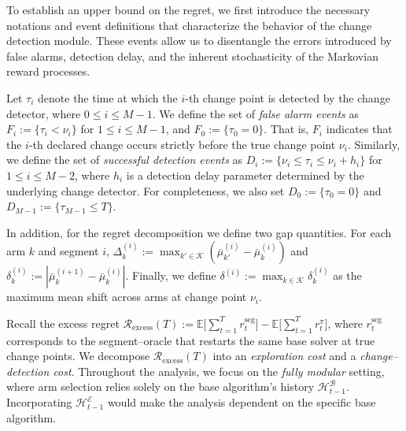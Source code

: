 \documentclass[twoside]{article}
\theoremstyle{plain}
\theoremstyle{definition}
\theoremstyle{remark}
\def\Rex{\mathcal{R}_{\mathrm{excess}}}
\begin{document}
To establish an upper bound on the regret, we first introduce the necessary 
notations and event definitions that characterize the behavior of the change 
detection module. These events allow us to disentangle the errors introduced by 
false alarms, detection delay, and the inherent stochasticity of the Markovian 
reward processes. 

Let $\tau_i$ denote the time at which the $i$-th change point is detected by the 
change detector, where $0 \leq i \leq M-1$. 
We define the set of \emph{false alarm events} as 
$F_i := \{\tau_i < \nu_i\}$ for $1 \leq i \leq M-1$, and $F_0 := \{\tau_0 = 0\}$. 
That is, $F_i$ indicates that the $i$-th declared change occurs strictly before the 
true change point $\nu_i$. 
Similarly, we define the set of \emph{successful detection events} as 
$D_i := \{\nu_i \leq \tau_i \leq \nu_i + h_i\}$ for $1 \leq i \leq M-2$, 
where $h_i$ is a detection delay parameter determined by the underlying change 
detector. For completeness, we also set $D_0 := \{\tau_0 = 0\}$ and 
$D_{M-1} := \{\tau_{M-1} \leq T\}$.



In addition, for the regret decomposition we define two gap quantities. 
For each arm $k$ and segment $i$, 
$\Delta_k^{(i)} := \max_{k' \in \mathcal{K}} (\bar{\mu}_{k'}^{(i)} - \bar{\mu}_k^{(i)})$ 
and $\delta_k^{(i)} := |\bar{\mu}_k^{(i+1)} - \bar{\mu}_k^{(i)}|$. 
Finally, we define $\delta^{(i)} := \max_{k \in \mathcal{K}} \delta_k^{(i)}$ as the 
maximum mean shift across arms at change point $\nu_i$.

Recall the excess regret $\Rex(T) := \mathbb{E}\!\big[\sum_{t=1}^{T} r_t^{\mathrm{seg}}\big]-\mathbb{E}\!\big[\sum_{t=1}^{T} r_t^{\pi}\big]$, where $r_t^{\mathrm{seg}}$ corresponds to the segment–oracle that restarts the same base solver at true change points. We decompose $\Rex(T)$ into an \emph{exploration cost} and a \emph{change–detection cost}. Throughout the analysis, we focus on the \emph{fully modular} setting, where arm selection relies solely on the base algorithm’s history $\mathcal{H}^{\mathcal{B}}_{t-1}$. Incorporating $\mathcal{H}^{\mathcal{E}}_{t-1}$ would make the analysis dependent on the specific base algorithm.
\end{document}
